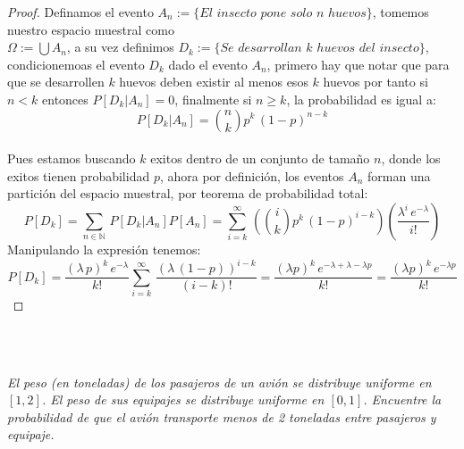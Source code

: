 \documentclass[11pt,letterpaper]{article}
\newcommand{\N}{\mathbb{N}}
\begin{document}
\begin{proof}
    Definamos el evento $A_n:=\{El\,\,insecto\,\,pone\,\,solo\,\,n\,\,huevos\}$, tomemos nuestro espacio muestral como\\
     $\Omega:=\bigcup A_n$, a su vez definimos $D_k:=\{Se\,\,desarrollan\,\,k\,\,huevos\,\,del\,\,insecto\}$, condicionemoas el evento $D_k$ dado el evento $A_n$, primero hay que notar que para que se desarrollen $k$ huevos deben existir al menos esos
     $k$ huevos por tanto si $n<k$ entonces $P[D_k|A_n]=0$, finalmente si $n\geq k$, la probabilidad es igual a:\,\\
     \begin{equation*}
        P[D_k|A_n]=\binom{n}{k}p^k\,(1-p)^{n-k} 
     \end{equation*}\,\\
     Pues estamos buscando $k$ exitos dentro de un conjunto de tamaño $n$, donde los exitos tienen probabilidad $p$, ahora por definici\'on, los eventos $A_n$ forman una partici\'on del espacio muestral, por teorema de probabilidad total:\,\\
     \begin{equation*}
        P[D_k]=\sum_{n\in \N}\,P[D_k|A_n]P[A_n]=\sum_{i=k}^{\infty}\,\left(\binom{i}{k}p^k\,(1-p)^{i-k} \right)\left(\frac{\lambda^i\,e^{-\lambda}}{i!}\right)
     \end{equation*}
     Manipulando la expresi\'on tenemos:\,\\
     \begin{equation*}
        P[D_k]=\frac{(\lambda\,p)^k\,e^{-\lambda}}{k!}\sum_{i=k}^{\infty}\,\frac{(\lambda\,(1-p))^{i-k}}{(i-k)!}=\frac{(\lambda p)^k\,e^{-\lambda+\lambda-\lambda p}}{k!}=\frac{(\lambda p)^k\,e^{-\lambda p}}{k!}
     \end{equation*}
\end{proof}\,\\
\,\\
\begin{tcolorbox}[
	title = \textcolor{black}{\textcolor{white}{Problema 7}},]
\textit{El peso (en toneladas) de los pasajeros de un avi\'on se distribuye uniforme en $[1,2]$. El peso de sus equipajes se distribuye uniforme en $[0,1]$. Encuentre la probabilidad de que el avi\'on transporte menos de 2 toneladas entre pasajeros y equipaje.}
\end{tcolorbox}
\end{document}
